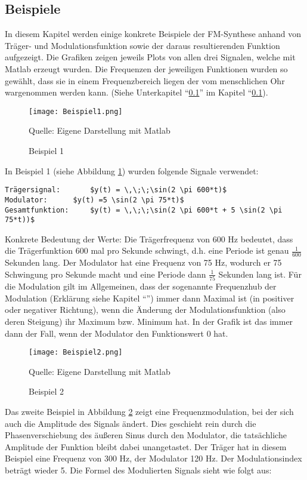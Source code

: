 \subsection{Beispiele}
In diesem Kapitel werden einige konkrete Beispiele der FM-Synthese anhand von Träger- und Modulationsfunktion sowie der daraus resultierenden Funktion aufgezeigt. Die Grafiken zeigen jeweils Plots von allen drei Signalen, welche mit Matlab erzeugt wurden.
Die Frequenzen der jeweiligen Funktionen wurden so gewählt, dass sie in einem Frequenzbereich liegen der vom menschlichen Ohr wargenommen werden kann. (Siehe Unterkapitel ``\ref{}'' im Kapitel ``\ref{}).

\begin{figure} [ht]
\centering
  \texttt{[image: Beispiel1.png]}
\caption{Beispiel 1}
\label{fig:beispiel1}
Quelle: Eigene Darstellung mit Matlab
\end{figure}

In Beispiel 1 (siehe Abbildung \ref{fig:beispiel1})  wurden folgende Signale verwendet:

\begin{lstlisting}[mathescape]
Trägersignal: 		$y(t) = \,\;\;\sin(2 \pi 600*t)$
Modulator:		$y(t) =5 \sin(2 \pi 75*t)$
Gesamtfunktion: 	$y(t) = \,\;\;\sin(2 \pi 600*t + 5 \sin(2 \pi 75*t))$
\end{lstlisting}

Konkrete Bedeutung der Werte: Die Trägerfrequenz von 600 Hz bedeutet, dass die Trägerfunktion 600 mal pro Sekunde schwingt, d.h. eine Periode ist genau $\frac{1}{600}$ Sekunden lang. Der Modulator hat eine Frequenz von 75 Hz, wodurch er 75 Schwingung pro Sekunde macht und eine Periode dann $\frac{1}{75}$ Sekunden lang ist. Für die Modulation gilt im Allgemeinen, dass der sogenannte Frequenzhub der Modulation (Erklärung siehe Kapitel ``'') immer dann Maximal ist (in positiver oder negativer Richtung), wenn die Änderung der Modulationsfunktion (also deren Steigung) ihr Maximum bzw. Minimum hat. In der Grafik ist das immer dann der Fall, wenn der Modulator den Funktionswert 0 hat.

\begin{figure} [ht]
\centering
  \texttt{[image: Beispiel2.png]}
\caption{Beispiel 2}
\label{fig:beispiel2}
Quelle: Eigene Darstellung mit Matlab
\end{figure}

Das zweite Beispiel in Abbildung \ref{fig:beispiel2} zeigt eine Frequenzmodulation, bei der sich auch die Amplitude des Signals ändert. Dies geschieht rein durch die Phasenverschiebung des äußeren Sinus durch den Modulator, die tatsächliche Amplitude der Funktion bleibt dabei unangetastet. Der Träger hat in diesem Beispiel eine Frequenz von 300 Hz, der Modulator 120 Hz. Der Modulationsindex beträgt wieder 5. Die Formel des Modulierten Signals sieht wie folgt aus:


